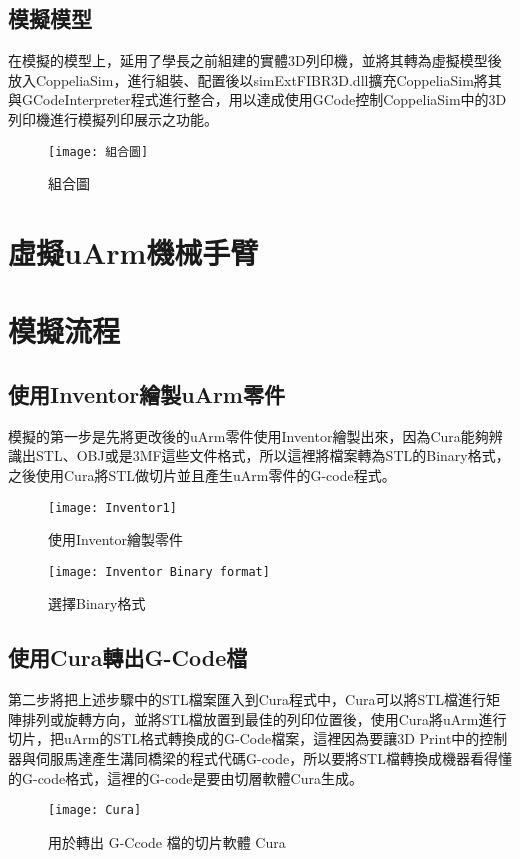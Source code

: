  \subsection{模擬模型}
 在模擬的模型上，延用了學長之前組建的實體3D列印機，並將其轉為虛擬模型後放入CoppeliaSim，進行組裝、配置後以simExtFIBR3D.dll擴充CoppeliaSim將其與GCodeInterpreter程式進行整合，用以達成使用GCode控制CoppeliaSim中的3D列印機進行模擬列印展示之功能。\\
\begin{figure}[hbt!]
\center
\texttt{[image: 組合圖]}
\caption{\Large 組合圖}
\label{組合圖}
\end{figure}

\section{虛擬uArm機械手臂}

\section{模擬流程}

\subsection{使用Inventor繪製uArm零件}
 模擬的第一步是先將更改後的uArm零件使用Inventor繪製出來，因為Cura能夠辨識出STL、OBJ或是3MF這些文件格式，所以這裡將檔案轉為STL的Binary格式，之後使用Cura將STL做切片並且產生uArm零件的G-code程式。\\
\begin{figure}[hbt!]
\begin{center}
\texttt{[image: Inventor1]}
\caption{\Large 使用Inventor繪製零件}\label{Inventor1}
\end{center}
\end{figure}

\begin{figure}[hbt!]
\begin{center}
\texttt{[image: Inventor Binary format]}
\caption{\Large 選擇Binary格式}\label{Inventor Binary format}
\end{center}
\end{figure}

\subsection{使用Cura轉出G-Code檔}
 第二步將把上述步驟中的STL檔案匯入到Cura程式中，Cura可以將STL檔進行矩陣排列或旋轉方向，並將STL檔放置到最佳的列印位置後，使用Cura將uArm進行切片，把uArm的STL格式轉換成的G-Code檔案，這裡因為要讓3D Print中的控制器與伺服馬達產生溝同橋梁的程式代碼G-code，所以要將STL檔轉換成機器看得懂的G-code格式，這裡的G-code是要由切層軟體Cura生成。\\
\begin{figure}[hbt!]
\begin{center}
\texttt{[image: Cura]}
\caption{\Large 用於轉出 G-Ccode 檔的切片軟體 Cura}\label{Cura}
\end{center}
\end{figure}
